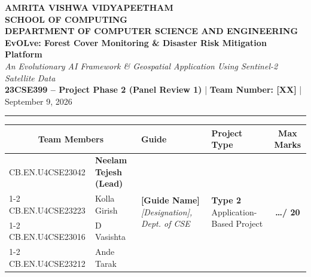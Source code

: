 \documentclass[11pt, a4paper]{article}
\begin{document}
\noindent
\begin{minipage}{\textwidth}
    \centering
    {\Large \textbf{\textcolor{amritaMaroon}{
    AMRITA VISHWA VIDYAPEETHAM \\
    SCHOOL OF COMPUTING \\
    DEPARTMENT OF COMPUTER SCIENCE AND ENGINEERING \\
    }}} 
    \vspace{0.15cm}
    {\large \textbf{EvOLve: Forest Cover Monitoring \& Disaster Risk Mitigation Platform}} \\
    \vspace{0.05cm}
    {\small \textit{An Evolutionary AI Framework \& Geospatial Application Using Sentinel-2 Satellite Data}} \\
    \vspace{0.1cm}
    \textbf{23CSE399 -- Project Phase 2 (Panel Review 1)} \quad | \quad \textbf{Team Number: [XX]} \quad | \quad September 9, 2026
\end{minipage}

\vspace{0.25cm}
\hrule
\vspace{0.25cm}

\noindent
\begin{center}
    \renewcommand{\arraystretch}{1.2}
    \setlength{\tabcolsep}{5pt}
    \small
    \begin{tabular}{|l|p{4.8cm}|p{4.2cm}|p{2.6cm}|c|}
        \hline
        \multicolumn{2}{|c|}{\textbf{Team Members}} & \textbf{Guide} & \textbf{Project Type} & \textbf{Max Marks} \\ 
        \hline
        CB.EN.U4CSE23042 & \textbf{Neelam Tejesh (Lead)} & 
        \multirow{4}{=}{\raggedright \textbf{[Guide Name]} \newline \textit{[Designation], \newline Dept. of CSE}} & 
        \multirow{4}{=}{\raggedright \textbf{Type 2} \newline Application-Based Project} & 
        \multirow{4}{*}{\textbf{\huge \dots / 20}} \\ \cline{1-2}
        CB.EN.U4CSE23223 & Kolla Girish & & & \\ \cline{1-2}
        CB.EN.U4CSE23016 & D Vasishta & & & \\ \cline{1-2}
        CB.EN.U4CSE23212 & Ande Tarak & & & \\ 
        \hline
    \end{tabular}
\end{center}
\vspace{0.15cm}
\end{document}
